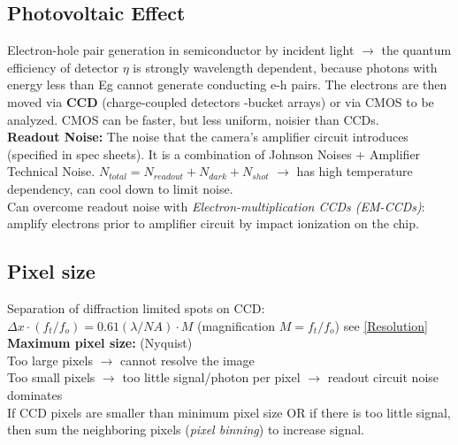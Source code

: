 \documentclass[9pt]{article}
\newcommand{\eqbox}[1]{\fcolorbox{black}{formula}{\hspace{0.5em}$\displaystyle#1$\hspace{0.5em}}}
\begin{document}
\begin{multicols}{2}
\subsection{Photovoltaic Effect}
Electron-hole pair generation in semiconductor by incident light $\rightarrow$ the quantum efficiency of detector $\eta$ is strongly wavelength dependent, because photons with energy less than Eg cannot generate conducting e-h pairs. The electrons are then moved via \textbf{CCD} (charge-coupled detectors -bucket arrays) or via CMOS to be analyzed. CMOS can be faster, but less uniform, noisier than CCDs.\\
\textbf{Readout Noise:} The noise that the camera’s amplifier circuit introduces (specified in spec sheets). It is a combination of Johnson Noises + Amplifier Technical Noise. $N_{total}=N_{readout}+N_{dark}+N_{shot}$ $\rightarrow$ has high temperature dependency, can cool down to limit noise.\\
Can overcome readout noise with \emph{Electron-multiplication CCDs (EM-CCDs)}: amplify
electrons prior to amplifier circuit by impact ionization on the chip.\\
\subsection{Pixel size}
Separation of diffraction limited spots on CCD:\\
 $\Delta x \cdot (f_t/f_o)=0.61(\lambda/NA)\cdot M$ (magnification $M=f_t/f_o$) see \ref{Resolution}\\
\textbf{Maximum pixel size:} \eqbox{0.5\cdot \Delta x\cdot M=0.3\cdot (\lambda/NA)\cdot M} (Nyquist)\\
Too large pixels $\rightarrow$ cannot resolve the image\\
Too small pixels $\rightarrow$ too little signal/photon per pixel $\rightarrow$ readout circuit noise dominates\\
If CCD pixels are smaller than minimum pixel size OR if there is too little signal, then sum the neighboring pixels (\emph{pixel binning}) to increase signal.

\end{multicols}
\end{document}
